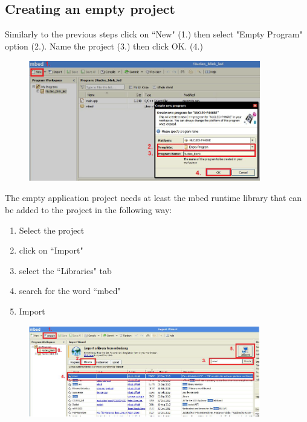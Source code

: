 \documentclass[a4paper]{article}
\begin{document}
\subsection{Creating an empty project}
Similarly to the previous steps click on ``New" (1.) then select "Empty Program" option (2.). Name the project (3.)
then click OK. (4.)

\begin{figure}[H]
    \centering
    \includegraphics[width=0.9\textwidth]{figures/mbed-empty-proj.png}
\end{figure}

The empty application project needs at least the mbed runtime library that can be added to the project in the following
way:
\begin{enumerate}
    \setcounter{enumi}{0}
    \item Select the project
    \item click on ``Import"
    \item select the ``Libraries" tab
    \item search for the word ``mbed"
    \item Import
\end{enumerate}

\begin{figure}[H]
    \centering
    \includegraphics[width=0.9\textwidth]{figures/mbed-import.png}
\end{figure}
\end{document}
